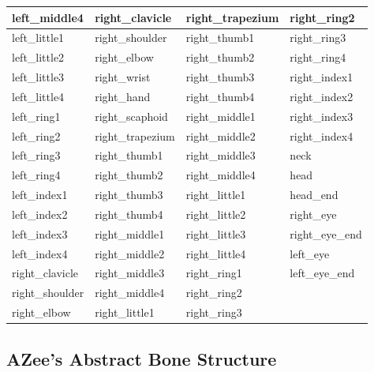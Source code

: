 \documentclass[../main.tex]{subfiles}
\begin{document}
\begin{longtable}{|l|l|l|l|}
    left\_middle4 & right\_clavicle & right\_trapezium & right\_ring2 \\ \hline
    left\_little1 & right\_shoulder & right\_thumb1 & right\_ring3 \\ \hline
    left\_little2 & right\_elbow & right\_thumb2 & right\_ring4 \\ \hline
    left\_little3 & right\_wrist & right\_thumb3 & right\_index1 \\ \hline
    left\_little4 & right\_hand & right\_thumb4 & right\_index2 \\ \hline
    left\_ring1 & right\_scaphoid & right\_middle1 & right\_index3 \\ \hline
    left\_ring2 & right\_trapezium & right\_middle2 & right\_index4 \\ \hline
    left\_ring3 & right\_thumb1 & right\_middle3 & neck \\ \hline
    left\_ring4 & right\_thumb2 & right\_middle4 & head \\ \hline
    left\_index1 & right\_thumb3 & right\_little1 & head\_end \\ \hline
    left\_index2 & right\_thumb4 & right\_little2 & right\_eye \\ \hline
    left\_index3 & right\_middle1 & right\_little3 & right\_eye\_end \\ \hline
    left\_index4 & right\_middle2 & right\_little4 & left\_eye \\ \hline
    right\_clavicle & right\_middle3 & right\_ring1 & left\_eye\_end \\ \hline
    right\_shoulder & right\_middle4 & right\_ring2 &  \\ \hline
    right\_elbow & right\_little1 & right\_ring3 &  \\ \hline
\end{longtable}

\subsection{AZee's Abstract Bone Structure}
\label{annex:background_work:azee_abstract_bones}
\end{document}
